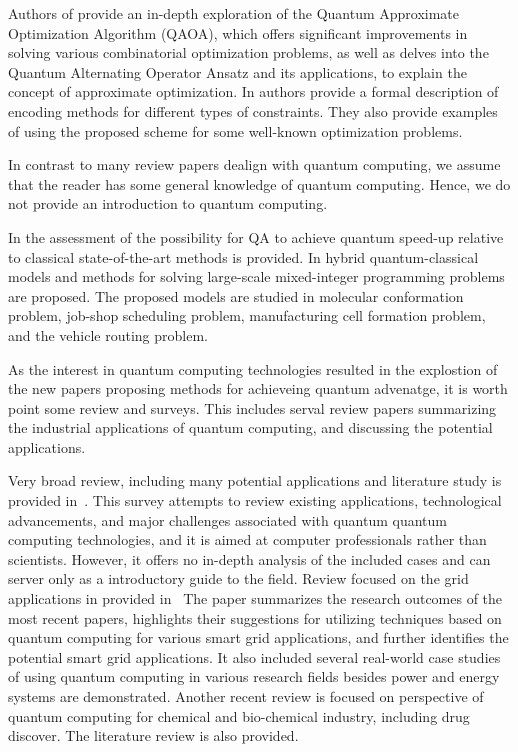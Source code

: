 \documentclass[a4paper,11pt]{article}
\begin{document}
Authors of \cite{choi2019tutorial} provide an in-depth exploration of the Quantum Approximate Optimization Algorithm (QAOA), which offers significant improvements in solving various combinatorial optimization problems, as well as delves into the Quantum Alternating Operator Ansatz and its applications,  to explain the concept of approximate optimization. In \cite{ruan2023quantum} authors provide a formal description of encoding methods for different types of constraints. They also provide examples of using the proposed scheme for some well-known optimization problems.

In contrast to many review papers dealign with quantum computing, we assume that the reader has some general knowledge of quantum computing. Hence, we do not provide an introduction to quantum computing.

In \cite{crosson2021prospects} the assessment of the possibility for QA to 
achieve quantum speed-up relative to classical state-of-the-art methods is provided. In \cite{ajagekar2020quantum} hybrid quantum-classical models and methods for solving large-scale mixed-integer programming problems are proposed. The proposed models are studied in molecular conformation problem, job-shop scheduling problem, manufacturing cell formation
problem, and the vehicle routing problem.

As the interest in quantum computing technologies resulted in the explostion of the new papers proposing methods for achieveing quantum advenatge, it is worth point some review and surveys. This includes serval review papers summarizing the industrial applications of quantum computing, and discussing the potential applications.

Very broad review, including many potential applications and literature study is provided in~\cite{singh2023contemporary}. This survey attempts to review existing applications, technological advancements, and major challenges associated with quantum quantum computing technologies, and it is aimed at computer professionals rather than scientists. However, it offers no in-depth analysis of the included cases and can server only as a introductory guide to the field.
Review focused on the grid applications in provided in~\cite{ullah2022quantum} The paper summarizes the research outcomes of the most recent papers, highlights their suggestions for utilizing techniques based on quantum computing for various smart grid applications, and further identifies the potential smart grid applications. It also included several real-world case studies of using quantum computing in various research fields besides power and energy systems are demonstrated.
Another recent review \cite{nourbakhsh2022quantum} is focused on perspective of quantum computing for chemical and bio-chemical industry, including drug discover. The literature review is also provided.
\end{document}
